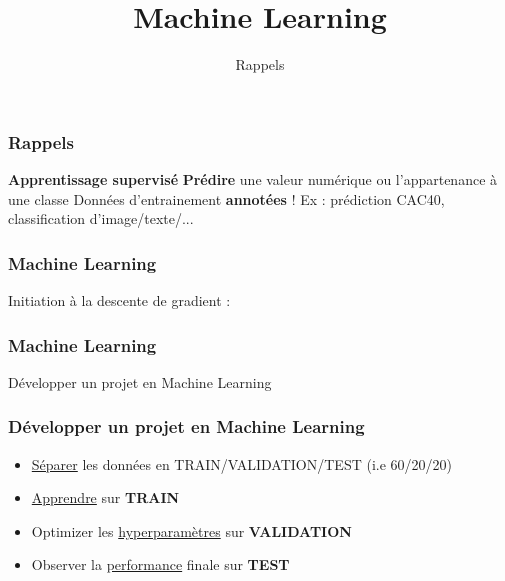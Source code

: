 \documentclass{formation}
\title{Machine Learning}
\subtitle{Rappels}
\begin{document}
\maketitle

\begin{frame}
  \frametitle{Rappels}
  \textbf{Apprentissage supervisé}
  \newline \newline
  \textbf{Prédire} une valeur numérique ou l'appartenance à une classe
  \newline
  Données d'entrainement \textbf{annotées} !
  \newline \newline
  Ex : prédiction CAC40, classification d'image/texte/...
\end{frame}

\begin{frame}
  \frametitle{Machine Learning}
  \begin{center}
    Initiation à la descente de gradient :
  \end{center}
  \begin{minipage}[l]{0.49\linewidth}
  \end{minipage}\hfill
  \begin{minipage}[l]{0.49\linewidth}
  \end{minipage}\hfill
\end{frame}

\begin{frame}
  \frametitle{Machine Learning}
  \begin{center}
  Développer un projet en Machine Learning
  \end{center}
\end{frame}

\begin{frame}
  \frametitle{Développer un projet en Machine Learning}
  \begin{itemize}
  \item \underline{Séparer} les données en TRAIN/VALIDATION/TEST (i.e 60/20/20)
  \item \underline{Apprendre} sur \textbf{TRAIN}
  \item Optimizer les \underline{hyperparamètres} sur \textbf{VALIDATION}
  \item Observer la \underline{performance} finale sur \textbf{TEST}
  \end{itemize}
\end{frame}
\end{document}
